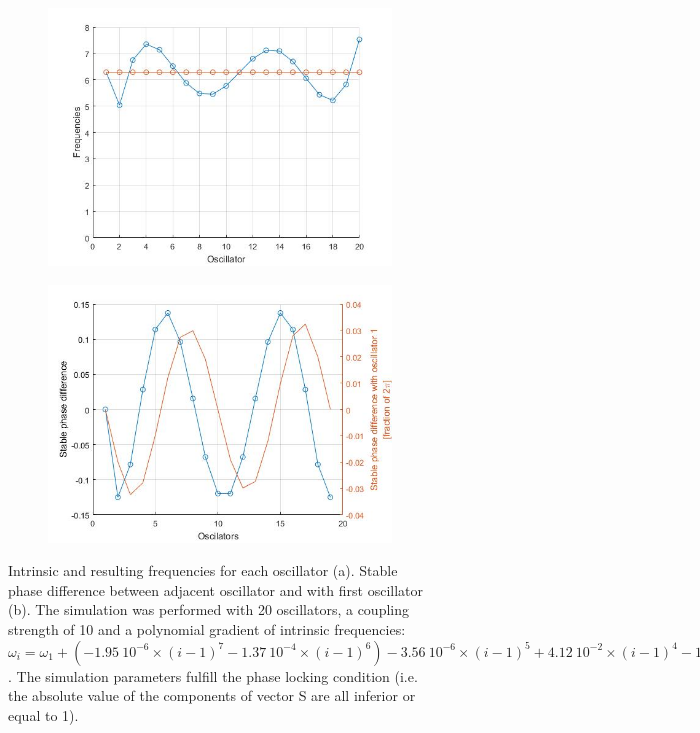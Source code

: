 \documentclass[a4paper]{scrartcl}
\begin{document}
\vspace{1cm}

\begin{figure}[!b]
	\centering
	\begin{subfigure}[b]{0.49\textwidth}
		\centering
		\includegraphics[width=\textwidth]{results/6.b/standWaveFreq.jpg}
		\caption{}
	\end{subfigure}
	\centering
	\begin{subfigure}[b]{0.49\textwidth}
		\centering
		\includegraphics[width=\textwidth]{results/6.b/standWavePhase.jpg}
		\caption{}
	\end{subfigure}
	\caption{Intrinsic and resulting frequencies for each oscillator (a). Stable phase difference between adjacent oscillator and with first oscillator (b). The simulation was performed with 20 oscillators, a coupling strength of 10 and a polynomial gradient of intrinsic frequencies: $\omega_i = \omega_{1} + (-1.95\ 10^{-6}\times(i-1)^7 -1.37\ 10^{-4}\times(i-1)^6) -3.56\ 10^{-6}\times(i-1)^5 +4.12\ 10^{-2}\times(i-1)^4 -1.76\ 10^{-1}\times(i-1)^3 -2.43\ 10^{-1}\times(i-1)^2 +3.16\times(i-1)-4.02$. The simulation parameters fulfill the phase locking condition (i.e. the absolute value of the components of vector S are all inferior or equal to 1).}\label{stand}
\end{figure}
\end{document}

